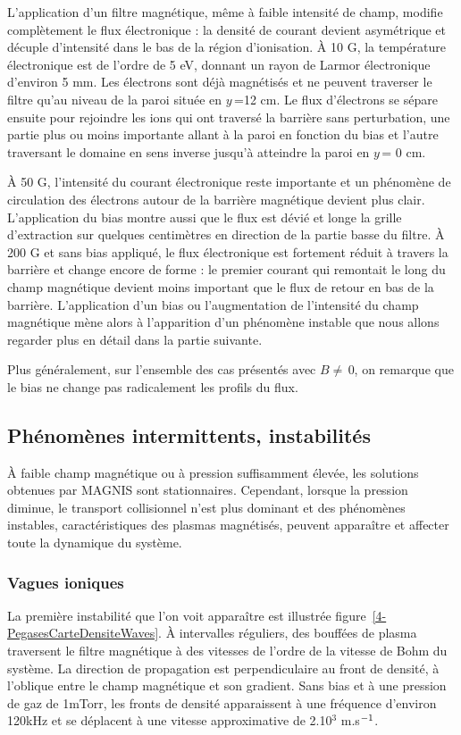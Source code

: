 \begin{refsection}
L'application d'un filtre magnétique, même à faible intensité de champ, modifie
complètement le flux électronique : la densité de courant devient asymétrique et
décuple d'intensité dans le bas de la région d'ionisation. À 10 G, la
température électronique est de l'ordre de 5 eV, donnant un rayon de Larmor
électronique d'environ 5 mm. Les électrons sont déjà magnétisés et ne peuvent
traverser le filtre qu'au niveau de la paroi située en $y\,$=12 cm. Le flux
d'électrons se sépare ensuite pour rejoindre les ions qui ont traversé la
barrière sans perturbation, une partie plus ou moins importante allant à la
paroi en fonction du bias et l'autre traversant le domaine en sens inverse
jusqu'à atteindre la paroi en $y\,$= 0 cm.

À 50 G, l'intensité du courant électronique reste importante et un phénomène de
circulation des électrons autour de la barrière magnétique devient plus clair.
L'application du bias montre aussi que le flux est dévié et longe la grille
d'extraction sur quelques centimètres en direction de la partie basse du filtre.
À 200 G et sans bias appliqué, le flux électronique est fortement réduit à travers la barrière et change encore de
forme : le premier courant qui remontait le long du champ magnétique devient
moins important que le flux de retour en bas de la barrière. L'application d'un
bias ou l'augmentation de l'intensité du champ magnétique mène alors à
l'apparition d'un phénomène instable que nous allons regarder plus en détail dans la partie suivante.

Plus généralement, sur l'ensemble des cas présentés avec $B\neq\,$0, on remarque
que le bias ne change pas radicalement les profils du flux.

\subsection{Phénomènes intermittents, instabilités}
À faible champ magnétique ou à pression suffisamment élevée, les solutions
obtenues par MAGNIS sont stationnaires.
Cependant, lorsque la pression diminue, le transport collisionnel n'est plus
dominant et des phénomènes instables, caractéristiques des plasmas
magnétisés, peuvent apparaître et affecter toute la dynamique du système. 
 
\subsubsection{Vagues ioniques}
La première instabilité que l'on voit apparaître est illustrée
figure~\ref{4-PegasesCarteDensiteWaves}. À intervalles réguliers, des bouffées
de plasma traversent le filtre magnétique à des vitesses de l'ordre de la
vitesse de Bohm du système.
La direction de propagation est perpendiculaire au front de densité, à
l'oblique entre le champ magnétique et son gradient. Sans bias et à une
pression de gaz de 1mTorr, les fronts de densité apparaissent à une fréquence
d'environ 120kHz et se déplacent à une vitesse approximative de 2.10$^3$
m.s$^{{-1}}$.
 

\end{refsection}
